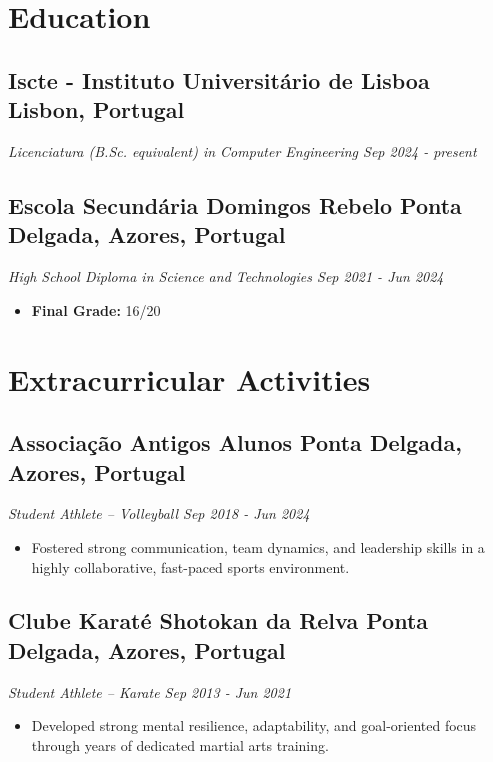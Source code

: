 \documentclass[a4paper,10pt]{article}
\begin{document}

\section{Education}
    \subsection*{\texorpdfstring{
            \textbf{Iscte - Instituto Universitário de Lisboa} \hfill Lisbon, Portugal
        }{
            Iscte - Instituto Universitário de Lisboa -- Lisbon, Portugal
        }}
    \textit{Licenciatura (B.Sc. equivalent) in Computer Engineering \hfill Sep 2024 - present}

    \subsection*{\texorpdfstring{
            \textbf{Escola Secundária Domingos Rebelo} \hfill Ponta Delgada, Azores, Portugal
        }{
            Escola Secundária Domingos Rebelo -- Ponta Delgada, Azores, Portugal
        }}
    \textit{High School Diploma in Science and Technologies \hfill Sep 2021 - Jun 2024}
        \begin{itemize}
            \item \textbf{Final Grade:} 16/20
        \end{itemize}


\section{Extracurricular Activities} 
    \subsection*{\texorpdfstring{
            \textbf{Associação Antigos Alunos} \hfill Ponta Delgada, Azores, Portugal
        }{
            Associação Antigos Alunos -- Ponta Delgada, Azores, Portugal
        }}
    \textit{Student Athlete -- Volleyball \hfill Sep 2018 - Jun 2024}
        \begin{itemize}
            \item Fostered strong communication, team dynamics, and leadership skills in a highly collaborative, fast-paced sports environment.
        \end{itemize}

    \subsection*{\texorpdfstring{
            \textbf{Clube Karaté Shotokan da Relva} \hfill Ponta Delgada, Azores, Portugal
        }{
            Clube Karaté Shotokan da Relva -- Ponta Delgada, Azores, Portugal
        }}
    \textit{Student Athlete -- Karate \hfill Sep 2013 - Jun 2021}
        \begin{itemize}
            \item Developed strong mental resilience, adaptability, and goal-oriented focus through years of dedicated martial arts training.
        \end{itemize}
\end{document}
